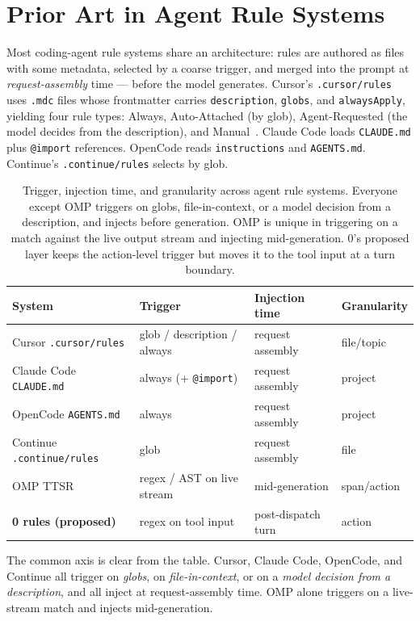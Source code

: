 \documentclass[11pt]{article}
\begin{document}
\section{Prior Art in Agent Rule Systems}
\label{sec:priorart}

Most coding-agent rule systems share an architecture: rules are authored as
files with some metadata, selected by a coarse trigger, and merged into the
prompt at \emph{request-assembly} time --- before the model generates. Cursor's
\texttt{.cursor/rules} uses \texttt{.mdc} files whose frontmatter carries
\texttt{description}, \texttt{globs}, and \texttt{alwaysApply}, yielding four
rule types: Always, Auto-Attached (by glob), Agent-Requested (the model decides
from the description), and Manual~\cite{cursorrules}. Claude Code loads
\texttt{CLAUDE.md} plus \texttt{@import} references. OpenCode reads
\texttt{instructions} and \texttt{AGENTS.md}. Continue's \texttt{.continue/rules}
selects by glob.

\begin{table}[ht]
\centering
\small
\begin{tabular}{llll}
\toprule
System & Trigger & Injection time & Granularity \\
\midrule
Cursor \texttt{.cursor/rules} & glob / description / always & request assembly & file/topic \\
Claude Code \texttt{CLAUDE.md} & always (+ \texttt{@import}) & request assembly & project \\
OpenCode \texttt{AGENTS.md} & always & request assembly & project \\
Continue \texttt{.continue/rules} & glob & request assembly & file \\
OMP TTSR & regex / AST on live stream & mid-generation & span/action \\
\textbf{0 rules (proposed)} & regex on tool input & post-dispatch turn & action \\
\bottomrule
\end{tabular}
\caption{Trigger, injection time, and granularity across agent rule systems.
Everyone except OMP triggers on globs, file-in-context, or a model decision from
a description, and injects before generation. OMP is unique in triggering on a
match against the live output stream and injecting mid-generation. 0's
proposed layer keeps the action-level trigger but moves it to the tool input at a
turn boundary.}
\end{table}

The common axis is clear from the table. Cursor, Claude Code, OpenCode, and
Continue all trigger on \emph{globs}, on \emph{file-in-context}, or on a
\emph{model decision from a description}, and all inject at request-assembly
time. OMP alone triggers on a live-stream match and injects mid-generation.
\end{document}
